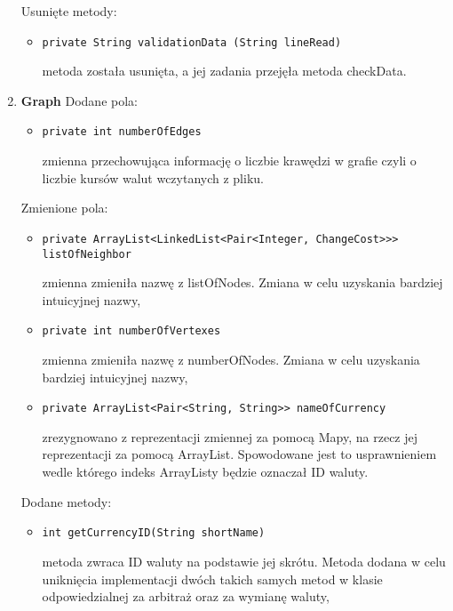\documentclass[12pt]{article}
\begin{document}
\begin{enumerate}
\begin{itemize}
    \end{itemize}
    Usunięte metody:
    \begin{itemize}
        \item \begin{verbatim}private String validationData (String lineRead)\end{verbatim}
        metoda została usunięta, a jej zadania przejęła metoda checkData.
    \end{itemize}
\item \textbf{Graph}
\newline\newline
   Dodane pola:
   \begin{itemize}
        \item \begin{verbatim}private int numberOfEdges\end{verbatim}
        zmienna przechowująca informację o liczbie krawędzi w grafie czyli o liczbie kursów walut wczytanych z pliku.
    \end{itemize}
   Zmienione pola:
    \begin{itemize}
        \item \begin{verbatim}private ArrayList<LinkedList<Pair<Integer, ChangeCost>>> listOfNeighbor\end{verbatim}
        zmienna zmieniła nazwę z listOfNodes. Zmiana w celu uzyskania bardziej intuicyjnej nazwy,
    \item \begin{verbatim}private int numberOfVertexes\end{verbatim}
        zmienna zmieniła nazwę z numberOfNodes. Zmiana w celu uzyskania bardziej intuicyjnej nazwy,
    \item \begin{verbatim}private ArrayList<Pair<String, String>> nameOfCurrency\end{verbatim}
        zrezygnowano z reprezentacji zmiennej za pomocą Mapy, na rzecz jej reprezentacji za pomocą ArrayList. Spowodowane jest to usprawnieniem wedle którego indeks ArrayListy będzie oznaczał ID waluty.
    \end{itemize}
    Dodane metody:
    \begin{itemize}
        \item \begin{verbatim}int getCurrencyID(String shortName)\end{verbatim}
        metoda zwraca ID waluty na podstawie jej skrótu. Metoda dodana w celu uniknięcia implementacji dwóch takich samych metod w klasie odpowiedzialnej za arbitraż oraz za wymianę waluty,

\end{itemize}
\end{enumerate}
\end{document}
